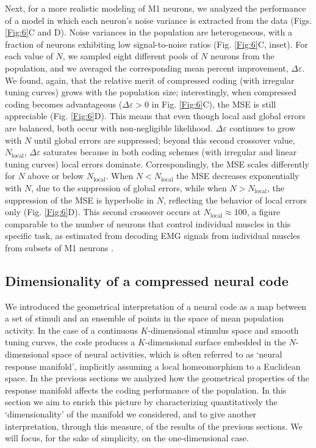 \documentclass[a4paper]{article}%
\begin{document}
Next, for a more realistic modeling of M1 neurons, we analyzed the performance
of a model in which each neuron's noise variance is extracted from the data
(Figs. \ref{Fig:6}C and D). Noise variances in the population are
heterogeneous, with a fraction of neurons exhibiting low signal-to-noise
ratios (Fig. \ref{Fig:6}C, inset). For each value of $N$, we sampled eight
different pools of $N$ neurons from the population, and we averaged the
corresponding mean percent improvement, $\Delta\varepsilon$. We found, again,
that the relative merit of compressed coding (with irregular tuning curves)
grows with the population size; interestingly, when compressed coding becomes
advantageous ($\Delta\varepsilon>0$ in Fig. \ref{Fig:6}C), the MSE is still
appreciable (Fig. \ref{Fig:6}D). This means that even though local and global
errors are balanced, both occur with non-negligible likelihood. $\Delta
\varepsilon$ continues to grow with $N$ until global errors are suppressed;
beyond this second crossover value, $N_{\text{local}}$, $\Delta\varepsilon$
saturates because in both coding schemes (with irregular and linear tuning
curves) local errors dominate. Correspondingly, the MSE scales differently for
$N$ above or below $N_{\text{local}}$. When $N<N_{\text{local}}$ the MSE
decreases exponentially with $N$, due to the suppression of global errors,
while when $N>N_{\text{local}}$, the suppression of the MSE is hyperbolic in
$N$, reflecting the behavior of local errors only (Fig. \ref{Fig:6}D). This
second crossover occurs at $N_{\text{local}}\approx100$, a figure comparable
to the number of neurons that control individual muscles in this specific
task, as estimated from decoding EMG signals from individual muscles from
subsets of M1 neurons \cite[]{Lalazar2016TuningConnectivity}.
\subsection*{Dimensionality of a compressed neural code }
\label{SuSe:Geo}
We introduced the geometrical interpretation of a neural code as a map between a set of stimuli and an ensemble of points in the space of mean population activity. In the case of a continuous $K$-dimensional stimulus space and smooth tuning curves, the code produces a $K$-dimensional surface embedded in the $N$-dimensional space of neural activities, which is often referred to as `neural response manifold'\cite[]{Seung2000ThePerception,Gallego2017NeuralMovement}, implicitly assuming a  local homeomorphism to a Euclidean space. In the previous sections we analyzed how the geometrical properties of the response manifold affects the coding performance of the population. In this section we aim to enrich this picture by characterizing quantitatively the `dimensionality' of the manifold we considered, and to give another interpretation, through this measure, of the results of the previous sections. We will focus, for the sake of simplicity, on the one-dimensional case.
\end{document}
